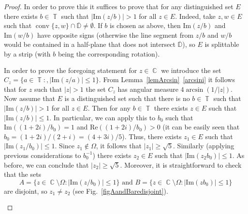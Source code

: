 \documentclass[10pt,a4paper]{amsart}
\DeclareMathOperator{\CC}{\mathbb C}
\DeclareMathOperator{\TT}{\mathbb T}
\DeclareMathOperator{\conv}{conv}
\begin{document}
	\begin{proof}
		In order to prove this it suffices to prove that for any distinguished set $E$ there exists $b \in \TT$ such that $|\mathrm{Im}(z/b)| > 1$ for all $z \in E$.
		Indeed, take $z,w \in E$ such that $\conv\{z, w\} \cap \overline{\mathbb D} \ne \emptyset$. If $b$ is chosen as above, then $ \mathrm{Im}(z/b)$ and $\mathrm{Im}(w/b)$ have opposite signs (otherwise the line segment from $z/b$ and $w/b$ would be contained in a half-plane that does not intersect $\overline{\mathbb D}$), so $E$ is splittable by a strip (with $b$ being the corresponding rotation).
		
		In order to prove the foregoing statement for $z \in \CC$ we introduce the set $C_z = \{a \in \TT:, |\mathrm{Im}(z/a)| \le 1\}$. From Lemma~\ref{lemArcsin}~\ref{arcsini} it follows that for $z$ such that $|z| > 1$ the set $C_z$ has angular measure $4\arcsin(1/|z|)$. Now assume that $E$ is a distinguished set such that there is no $b \in \TT$ such that  $|\mathrm{Im}(z/b)| > 1$ for all $z \in E$. Then for any $b \in \TT$ there exists $z \in E$ such that $|\mathrm{Im}(z/b)| \le 1$. In particular, we can apply this to $b_0$ such that $\mathrm{Im}((1 + 2i)/b_0) = 1$ and $\mathrm{Re}((1 + 2i)/b_0) > 0$ (it can be easily seen that $b_0 = (1 + 2i)/(2 + i) = (4 + 3i)/5$). Thus, there exists $z_1 \in E$ such that $|\mathrm{Im}(z_1/b_0)| \le 1$. Since $z_1 \notin \Omega$, it follows that $|z_1| \ge \sqrt{5}$. Similarly (applying previous considerations to $b_0^{-1}$) there exists $z_2 \in E$ such that $|\mathrm{Im}(z_2b_0)| \le 1$. As before, we can conclude that $|z_2| \ge \sqrt{5}$. Moreover, it is straightforward to check that the sets
		\begin{equation}\label{eqAandB}
		A  = \{z \in \CC \setminus \Omega: |\mathrm{Im}(z/b_0)| \le 1\} \text{ and } B  = \{z \in \CC \setminus \Omega: |\mathrm{Im}(zb_0)| \le 1\} 
		\end{equation}
		are disjoint, so $z_1 \ne z_2$ (see Fig.~\ref{figAandBaredisjoint}).
		\begin{figure}
\end{figure}
\end{proof}
\end{document}
